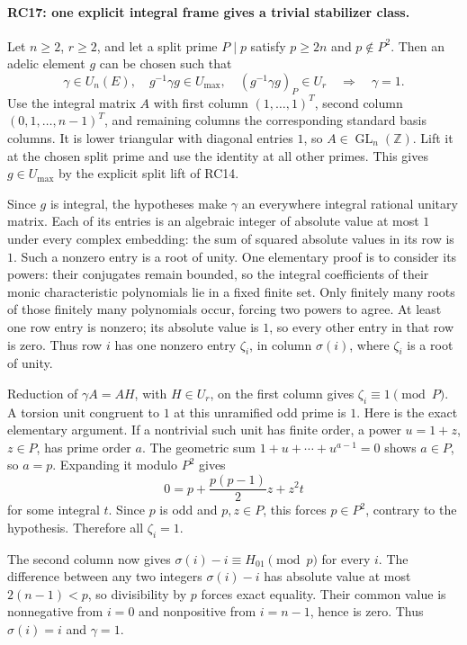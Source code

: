 \paragraph{RC17: one explicit integral frame gives a trivial stabilizer class.}
Let $n\ge2$, $r\ge2$, and let a split prime $P\mid p$ satisfy
$p\ge2n$ and $p\notin P^2$. Then an adelic element $g$ can be chosen
such that
\[
 \gamma\in U_n(E),\quad
 g^{-1}\gamma g\in U_{\max},\quad
 (g^{-1}\gamma g)_P\in U_r
             \quad\Longrightarrow\quad\gamma=1.         \tag{RC.19}
\]
Use the integral matrix $A$ with first column $(1,\ldots,1)^T$,
second column $(0,1,\ldots,n-1)^T$, and remaining columns the corresponding
standard basis columns. It is lower triangular with diagonal entries
$1$, so $A\in\operatorname{GL}_n(\mathbb Z)$. Lift it at the chosen
split prime and use the identity at all other primes. This gives
$g\in U_{\max}$ by the explicit split lift of RC14.

Since $g$ is integral, the hypotheses make $\gamma$ an everywhere
integral rational unitary matrix. Each of its entries is an algebraic
integer of absolute value at most $1$ under every complex embedding:
the sum of squared absolute values in its row is $1$.
Such a nonzero entry is a root of unity. One elementary proof is to
consider its powers: their conjugates remain bounded, so the integral
coefficients of their monic characteristic polynomials lie in a fixed
finite set. Only finitely many roots of those finitely many polynomials
occur, forcing two powers to agree.
At least one row entry is nonzero; its absolute value is $1$, so every
other entry in that row is zero. Thus row $i$ has one nonzero entry
$\zeta_i$, in column $\sigma(i)$, where $\zeta_i$ is a root of unity.

Reduction of $\gamma A=AH$, with $H\in U_r$, on the first column gives
$\zeta_i\equiv1\pmod P$.
A torsion unit congruent to $1$ at this unramified odd prime is $1$.
Here is the exact elementary argument. If a nontrivial such unit has
finite order, a power $u=1+z$, $z\in P$, has prime order $a$.
The geometric sum $1+u+\cdots+u^{a-1}=0$ shows $a\in P$,
so $a=p$. Expanding it modulo $P^2$ gives
\[
       0=p+\frac{p(p-1)}2 z+z^2 t
\]
for some integral $t$. Since $p$ is odd and $p,z\in P$, this forces
$p\in P^2$, contrary to the hypothesis. Therefore all $\zeta_i=1$.

The second column now gives
$\sigma(i)-i\equiv H_{01}\pmod p$ for every $i$.
The difference between any two integers $\sigma(i)-i$ has absolute
value at most $2(n-1)<p$, so divisibility by $p$ forces exact equality.
Their common value is nonnegative from $i=0$ and nonpositive from
$i=n-1$, hence is zero. Thus $\sigma(i)=i$ and $\gamma=1$.

